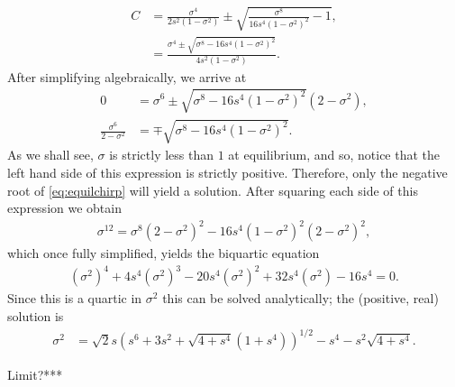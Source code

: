 \begin{align}
\nonumber
C &= \frac{\sigma^4}{2s^2(1 - \sigma^2)} \pm \sqrt{\frac{\sigma^8}{16s^4(1 - \sigma^2)^2} - 1}, \\
\label{eq:equilchirp}
&= \frac{\sigma^4 \pm \sqrt{\sigma^8 - 16s^4(1 - \sigma^2)^2}}{4s^2(1 - \sigma^2)}.
\end{align}
After simplifying algebraically, we arrive at
\begin{align*}
0 &= \sigma^6 \pm \sqrt{\sigma^8 - 16s^4(1 - \sigma^2)^2}(2 - \sigma^2), \\
\frac{\sigma^6}{2 - \sigma^2} &= \mp \sqrt{\sigma^8 - 16s^4(1 - \sigma^2)^2}.
\end{align*}
As we shall see, $\sigma$ is strictly less than $1$ at equilibrium, and so, notice that the left hand side of this expression is strictly positive. Therefore, only the negative root of \eqref{eq:equilchirp} will yield a solution. After squaring each side of this expression we obtain
\begin{align*}
\sigma^{12} = \sigma^8 (2 - \sigma^2)^2 - 16s^4 (1 - \sigma^2)^2 (2 - \sigma^2)^2,
\end{align*}
which once fully simplified, yields the biquartic equation
\begin{align*}
\left( \sigma^2 \right)^4 + 4 s^4 \left( \sigma^2 \right)^3 - 20 s^4 \left( \sigma^2 \right)^2 + 32 s^4 \left( \sigma^2 \right) - 16 s^4 = 0.
\end{align*}
Since this is a quartic in $\sigma^2$ this can be solved analytically; the (positive, real) solution is
\begin{align}
\label{eq:equilvar}
\sigma^2 &= \sqrt{2} s \left( s^6 + 3s^2 + \sqrt{4 + s^4} \left( 1 + s^4 \right) \right)^{1/2} - s^4 - s^2 \sqrt{4 + s^4}.
\end{align}

Limit?***

